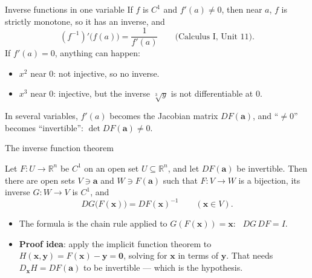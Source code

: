 \documentclass[10pt]{wosm-slides}
\newcommand{\R}{\mathbb{R}}
\newcommand{\vx}{\mathbf{x}}
\newcommand{\vy}{\mathbf{y}}
\newcommand{\va}{\mathbf{a}}
\begin{document}
\begin{frame}{Inverse functions in one variable}
  If $f$ is $C^1$ and $f'(a) \ne 0$, then near $a$, $f$ is strictly monotone, so it has an inverse,
  and
  \[ (f^{-1})'\bigl(f(a)\bigr) = \frac{1}{f'(a)} \qquad \text{(Calculus I, Unit 11).} \]
  \pause
  If $f'(a) = 0$, anything can happen:
  \begin{itemize}
    \item $x^2$ near $0$: not injective, so no inverse.
    \item $x^3$ near $0$: injective, but the inverse $\sqrt[3]{y}$ is not differentiable at $0$.
  \end{itemize}
  \pause
  In several variables, $f'(a)$ becomes the Jacobian matrix $DF(\va)$, and ``$\ne 0$'' becomes
  ``invertible'': $\det DF(\va) \ne 0$.
\end{frame}

\begin{frame}{The inverse function theorem}
  \begin{theorem}
    Let $F\colon U \to \R^n$ be $C^1$ on an open set $U \subseteq \R^n$, and let $DF(\va)$ be
    invertible. Then there are open sets $V \ni \va$ and $W \ni F(\va)$ such that $F\colon V \to W$ is
    a bijection, its inverse $G\colon W \to V$ is $C^1$, and
    \[ DG\bigl(F(\vx)\bigr) = DF(\vx)^{-1} \qquad (\vx \in V) . \]
  \end{theorem}
  \pause
  \begin{itemize}
    \item The formula is the chain rule applied to $G(F(\vx)) = \vx$: \ $DG\, DF = I$.
    \pause
    \item \textbf{Proof idea}: apply the implicit function theorem to $H(\vx, \vy) = F(\vx) - \vy = \mathbf 0$,
      solving for $\vx$ in terms of $\vy$. That needs $D_{\vx}H = DF(\va)$ to be invertible --- which
      is the hypothesis.
  \end{itemize}
\end{frame}
\end{document}
